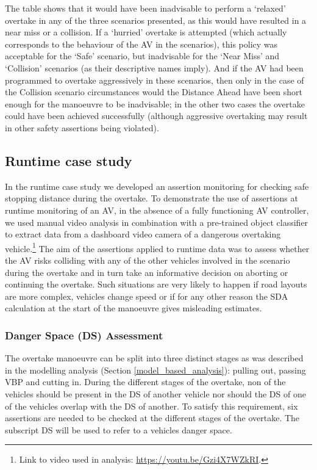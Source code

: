 The table shows that it would have been inadvisable to perform a `relaxed' overtake in any of the three scenarios presented, as this would have resulted in a near miss or a collision. If a `hurried' overtake is attempted (which actually corresponds to the behaviour of the AV in the scenarios), this policy was acceptable for the `Safe' scenario, but inadvisable for the `Near Miss' and `Collision' scenarios (as their descriptive names imply). And if the AV had been programmed to overtake aggressively in these scenarios, then only in the case of the Collision scenario circumstances would the Distance Ahead have been short enough for the manoeuvre to be inadvisable; in the other two cases the overtake could have been achieved successfully (although aggressive overtaking may result in other safety assertions being violated).

\subsection{Runtime case study}
In the runtime case study we developed an assertion monitoring for checking safe stopping distance during the overtake. 
%
To demonstrate the use of assertions at runtime monitoring of an AV, in the absence of a fully functioning AV controller, we used manual video analysis in combination with a pre-trained object classifier to extract data from a dashboard video camera of a dangerous overtaking vehicle.\footnote{Link to video used in analysis: \url{https://youtu.be/Gzi4X7WZkRI}.} 
%
The aim of the assertions applied to runtime data was to assess whether the AV risks colliding with any of the other vehicles involved in the scenario during the overtake and in turn take an informative decision on aborting or continuing the overtake. 
%
Such situations are very likely to happen if road layouts are more complex, vehicles change speed or if for any other reason the SDA calculation at the start of the manoeuvre gives misleading estimates. 

\subsubsection{Danger Space (DS) Assessment}
\label{DS_assessment}

The overtake manoeuvre can be split into three distinct stages as was described in the modelling analysis (Section \ref{model_based_analysis}): pulling out, passing VBP and cutting in.
%
During the different stages of the overtake, non of the vehicles should be present in the DS of another vehicle nor should the DS of one of the vehicles overlap with the DS of another. 
%
To satisfy this requirement, six assertions are needed to be checked at the different stages of the overtake.
%
The subscript DS will be used to refer to a vehicles danger space.

